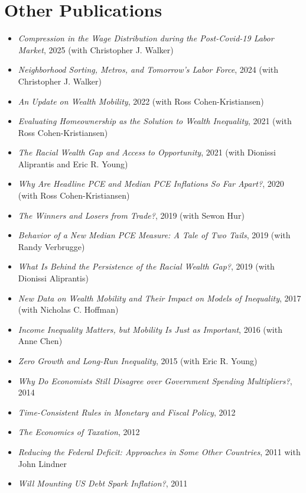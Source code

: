 \documentclass[11pt]{article}
\begin{document}
\section*{Other Publications}

\begin{itemize}
  \item \textit{Compression in the Wage Distribution during the Post-Covid-19 Labor Market}, 2025 (with Christopher J. Walker)
  \item \textit{Neighborhood Sorting, Metros, and Tomorrow's Labor Force}, 2024 (with Christopher J. Walker)
  \item \textit{An Update on Wealth Mobility}, 2022 (with Ross Cohen-Kristiansen)
  \item \textit{Evaluating Homeownership as the Solution to Wealth Inequality}, 2021 (with Ross Cohen-Kristiansen)
  \item \textit{The Racial Wealth Gap and Access to Opportunity}, 2021 (with Dionissi Aliprantis and Eric R. Young)
  \item \textit{Why Are Headline PCE and Median PCE Inflations So Far Apart?}, 2020 (with Ross Cohen-Kristiansen)
  \item \textit{The Winners and Losers from Trade?}, 2019 (with Sewon Hur)
  \item \textit{Behavior of a New Median PCE Measure: A Tale of Two Tails}, 2019 (with Randy Verbrugge)
  \item \textit{What Is Behind the Persistence of the Racial Wealth Gap?}, 2019 (with Dionissi Aliprantis)
  \item \textit{New Data on Wealth Mobility and Their Impact on Models of Inequality}, 2017 (with Nicholas C. Hoffman)
  \item \textit{Income Inequality Matters, but Mobility Is Just as Important}, 2016 (with Anne Chen)
  \item \textit{Zero Growth and Long-Run Inequality}, 2015 (with Eric R. Young)
  \item \textit{Why Do Economists Still Disagree over Government Spending Multipliers?}, 2014
  \item \textit{Time-Consistent Rules in Monetary and Fiscal Policy}, 2012
  \item \textit{The Economics of Taxation}, 2012
  \item \textit{Reducing the Federal Deficit: Approaches in Some Other Countries}, 2011 {with John Lindner}
  \item \textit{Will Mounting US Debt Spark Inflation?}, 2011
\end{itemize}
\end{document}

